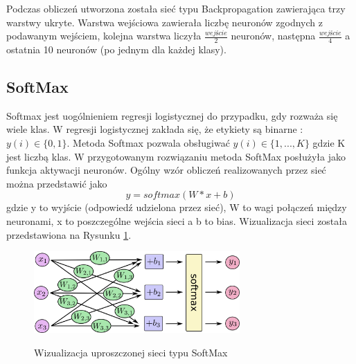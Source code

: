 \documentclass{article}
\begin{document}
Podczas obliczeń utworzona została sieć typu Backpropagation zawierająca trzy warstwy ukryte. Warstwa wejściowa zawierała liczbę neuronów zgodnych z podawanym wejściem, kolejna warstwa liczyła $\frac{wejście}{2}$ neuronów, następna $\frac{wejście}{4}$  a ostatnia 10 neuronów (po jednym dla każdej klasy).

\subsection{SoftMax}
Softmax jest uogólnieniem regresji logistycznej do przypadku, gdy rozważa się wiele klas. W regresji logistycznej zakłada się, że etykiety są binarne : $y(i) \in \{0,1\}$. Metoda Softmax pozwala obsługiwać $y(i) \in \{1, ..., K\}$ gdzie K jest liczbą klas. W przygotowanym rozwiązaniu metoda SoftMax posłużyła jako funkcja aktywacji neuronów. Ogólny wzór obliczeń realizowanych przez sieć można przedstawić jako
\[ y = softmax(W*x + b) \]
gdzie y to wyjście (odpowiedź udzielona przez sieć), W to wagi połączeń między neuronami, x to poszczególne wejścia sieci a b to bias. Wizualizacja sieci została przedstawiona na Rysunku \ref{softmax_visualize}.

\begin{figure}[htp]
	\centering
	\includegraphics[width=0.7\textwidth]{Figures/softmax-regression-scalargraph.png}
	\label{softmax_visualize}
	\caption{ Wizualizacja uproszczonej sieci typu SoftMax }
\end{figure}
\end{document}
